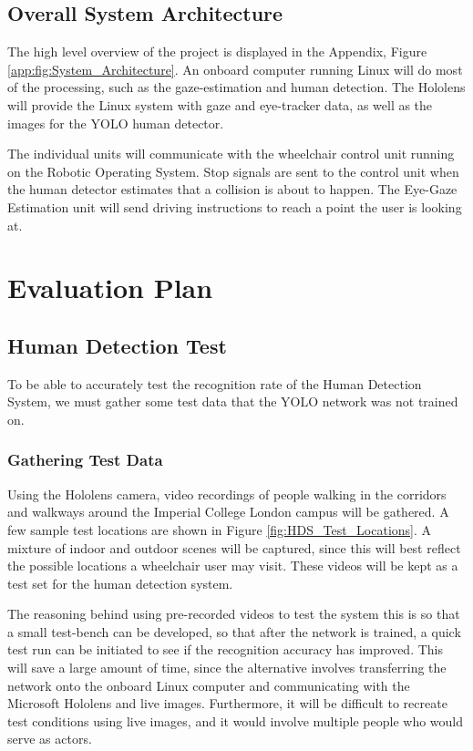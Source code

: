 \documentclass[12pt,a4paper]{report}
\begin{document}
\section{Overall System Architecture}
The high level overview of the project is displayed in the Appendix, Figure \ref{app:fig:System_Architecture}. An onboard computer running Linux will do most of the processing, such as the gaze-estimation and human detection. The Hololens will provide the Linux system with gaze and eye-tracker data, as well as the images for the YOLO human detector.

The individual units will communicate with the wheelchair control unit running on the Robotic Operating System. Stop signals are sent to the control unit when the human detector estimates that a collision is about to happen. The Eye-Gaze Estimation unit will send driving instructions to reach a point the user is looking at. 

\newpage
\chapter{Evaluation Plan}

\section{Human Detection Test}
To be able to accurately test the recognition rate of the Human Detection System, we must gather some test data that the YOLO network was not trained on. 

\subsection{Gathering Test Data}
Using the Hololens camera, video recordings of people walking in the corridors and walkways around the Imperial College London campus will be gathered. A few sample test locations are shown in Figure \ref{fig:HDS_Test_Locations}. A mixture of indoor and outdoor scenes will be captured, since this will best reflect the possible locations a wheelchair user may visit. These videos will be kept as a test set for the human detection system. 

The reasoning behind using pre-recorded videos to test the system this is so that a small test-bench can be developed, so that after the network is trained, a quick test run can be initiated to see if the recognition accuracy has improved. This will save a large amount of time, since the alternative involves transferring the network onto the onboard Linux computer and communicating with the Microsoft Hololens and live images. Furthermore, it will be difficult to recreate test conditions using live images, and it would involve multiple people who would serve as actors.
\end{document}
